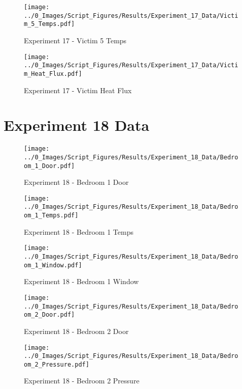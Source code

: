 	\clearpage

	\begin{figure}[H]
		\centering
		\texttt{[image: ../0\_Images/Script\_Figures/Results/Experiment\_17\_Data/Victim\_5\_Temps.pdf]}
		\caption[]{Experiment 17 - Victim 5 Temps}
	\end{figure}
 

	\begin{figure}[H]
		\centering
		\texttt{[image: ../0\_Images/Script\_Figures/Results/Experiment\_17\_Data/Victim\_Heat\_Flux.pdf]}
		\caption[]{Experiment 17 - Victim Heat Flux}
	\end{figure}
 
	\clearpage

\clearpage		\large
\section{Experiment 18 Data} \label{App:Exp18Results} 

	\begin{figure}[H]
		\centering
		\texttt{[image: ../0\_Images/Script\_Figures/Results/Experiment\_18\_Data/Bedroom\_1\_Door.pdf]}
		\caption[]{Experiment 18 - Bedroom 1 Door}
	\end{figure}
 

	\begin{figure}[H]
		\centering
		\texttt{[image: ../0\_Images/Script\_Figures/Results/Experiment\_18\_Data/Bedroom\_1\_Temps.pdf]}
		\caption[]{Experiment 18 - Bedroom 1 Temps}
	\end{figure}
 
	\clearpage

	\begin{figure}[H]
		\centering
		\texttt{[image: ../0\_Images/Script\_Figures/Results/Experiment\_18\_Data/Bedroom\_1\_Window.pdf]}
		\caption[]{Experiment 18 - Bedroom 1 Window}
	\end{figure}
 

	\begin{figure}[H]
		\centering
		\texttt{[image: ../0\_Images/Script\_Figures/Results/Experiment\_18\_Data/Bedroom\_2\_Door.pdf]}
		\caption[]{Experiment 18 - Bedroom 2 Door}
	\end{figure}
 
	\clearpage

	\begin{figure}[H]
		\centering
		\texttt{[image: ../0\_Images/Script\_Figures/Results/Experiment\_18\_Data/Bedroom\_2\_Pressure.pdf]}
		\caption[]{Experiment 18 - Bedroom 2 Pressure}
	\end{figure}
 

